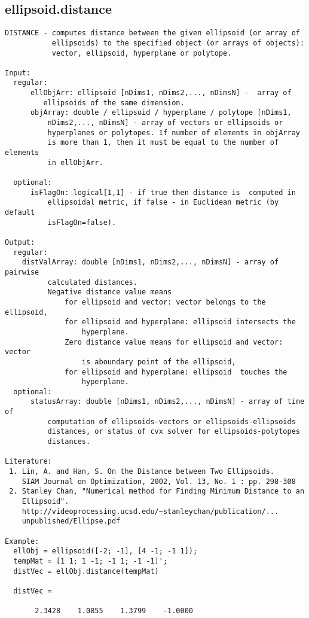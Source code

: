 \subsection{\texorpdfstring{ellipsoid.distance}{distance}}\label{method:ellipsoid.distance}
\begin{verbatim}
DISTANCE - computes distance between the given ellipsoid (or array of
           ellipsoids) to the specified object (or arrays of objects):
           vector, ellipsoid, hyperplane or polytope.

Input:
  regular:
      ellObjArr: ellipsoid [nDims1, nDims2,..., nDimsN] -  array of
         ellipsoids of the same dimension.
      objArray: double / ellipsoid / hyperplane / polytope [nDims1,
          nDims2,..., nDimsN] - array of vectors or ellipsoids or
          hyperplanes or polytopes. If number of elements in objArray
          is more than 1, then it must be equal to the number of elements
          in ellObjArr.

  optional:
      isFlagOn: logical[1,1] - if true then distance is  computed in
          ellipsoidal metric, if false - in Euclidean metric (by default
          isFlagOn=false).

Output:
  regular:
    distValArray: double [nDims1, nDims2,..., nDimsN] - array of pairwise
          calculated distances.
          Negative distance value means
              for ellipsoid and vector: vector belongs to the ellipsoid,
              for ellipsoid and hyperplane: ellipsoid intersects the
                  hyperplane.
              Zero distance value means for ellipsoid and vector: vector
                  is aboundary point of the ellipsoid,
              for ellipsoid and hyperplane: ellipsoid  touches the
                  hyperplane.
  optional:
      statusArray: double [nDims1, nDims2,..., nDimsN] - array of time of
          computation of ellipsoids-vectors or ellipsoids-ellipsoids
          distances, or status of cvx solver for ellipsoids-polytopes
          distances.

Literature:
 1. Lin, A. and Han, S. On the Distance between Two Ellipsoids.
    SIAM Journal on Optimization, 2002, Vol. 13, No. 1 : pp. 298-308
 2. Stanley Chan, "Numerical method for Finding Minimum Distance to an
    Ellipsoid".
    http://videoprocessing.ucsd.edu/~stanleychan/publication/...
    unpublished/Ellipse.pdf

Example:
  ellObj = ellipsoid([-2; -1], [4 -1; -1 1]);
  tempMat = [1 1; 1 -1; -1 1; -1 -1]';
  distVec = ellObj.distance(tempMat)

  distVec =

       2.3428    1.0855    1.3799    -1.0000
\end{verbatim}
